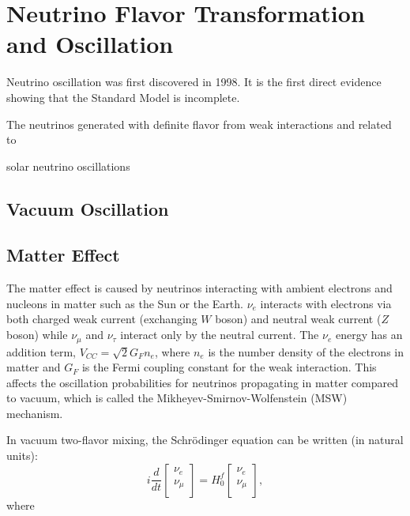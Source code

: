  
\section{Neutrino Flavor Transformation and Oscillation}

Neutrino oscillation was first discovered in 1998.
It is the first direct evidence showing that the Standard Model is incomplete. 

The neutrinos generated with definite flavor from weak interactions and related to 




solar neutrino oscillations

\subsection{Vacuum Oscillation}



\subsection{Matter Effect}

The matter effect is caused by neutrinos interacting with ambient electrons and nucleons in matter such as the Sun or the Earth. $\nu_e$ interacts with electrons via both charged weak current (exchanging $W$ boson) and neutral weak current ($Z$ boson) while $\nu_\mu$ and $\nu_\tau$ interact only by the neutral current. The $\nu_e$ energy has an addition term, $V_{CC} =\sqrt2G_Fn_e$, where $n_e$ is the number density of the electrons in matter and $G_F$ is the Fermi coupling constant for the weak interaction. This affects the oscillation probabilities for neutrinos propagating in matter compared to vacuum, which is called the Mikheyev-Smirnov-Wolfenstein (MSW) mechanism\cite{smirnov2016solar,smirnov2005msw}.

In vacuum two-flavor mixing, the Schr\"{o}dinger equation can be written (in natural units)\cite{xing2011neutrinos}:
\begin{equation}\label{eq:2flavor_simple}
	i\frac{d}{dt}\begin{bmatrix}
		\nu_e\\
		\nu_\mu\\
	\end{bmatrix}
	=
	H^f_0
	\begin{bmatrix}
		\nu_e\\
		\nu_\mu\\
	\end{bmatrix},
\end{equation}
where 

